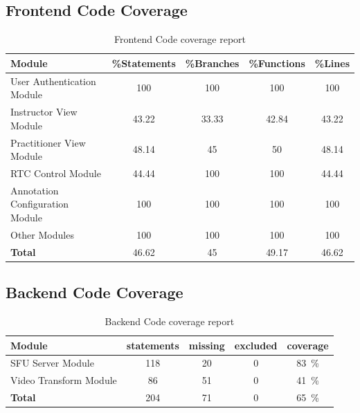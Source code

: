 \documentclass[12pt, titlepage]{article}
\begin{document}
\subsection*{Frontend Code Coverage}

\begin{table}[htbp]
  \centering
  \begin{tabular}{@{}lcccc@{}}
    \toprule
    \textbf{Module}                       & \textbf{\%Statements} & \textbf{\%Branches} & \textbf{\%Functions} & \textbf{\%Lines} \\ \midrule
    User Authentication Module      & 100             & 100           & 100            & 100        \\
    Instructor View Module          & 43.22           & 33.33         & 42.84          & 43.22      \\
    Practitioner View Module        & 48.14           & 45            & 50             & 48.14      \\
    RTC Control Module              & 44.44           & 100           & 100            & 44.44      \\
    Annotation Configuration Module & 100             & 100           & 100            & 100        \\
    Other Modules                   & 100             & 100           & 100            & 100        \\
    \midrule
    \textbf{Total}                        & 46.62           & 45            & 49.17          & 46.62      \\ \bottomrule
  \end{tabular}
  \caption{Frontend Code coverage report}
  \label{tab:frontend-cov}
\end{table}

\subsection*{Backend Code Coverage}

\begin{table}[htbp]
  \centering
  \begin{tabular}{@{}lcccc@{}}
    \toprule
    \textbf{Module}              & \textbf{statements} & \textbf{missing} & \textbf{excluded} & \textbf{coverage}       \\ \midrule
    SFU Server Module      & 118           & 20         & 0           & \SI{83}{\percent} \\
    Video Transform Module & 86            & 51         & 0           & \SI{41}{\percent} \\ \midrule
    \textbf{Total}               & 204           & 71         & 0           & \SI{65}{\percent} \\ \bottomrule
  \end{tabular}
  \caption{Backend Code coverage report}
  \label{tab:backend-cov}
\end{table}
\end{document}

